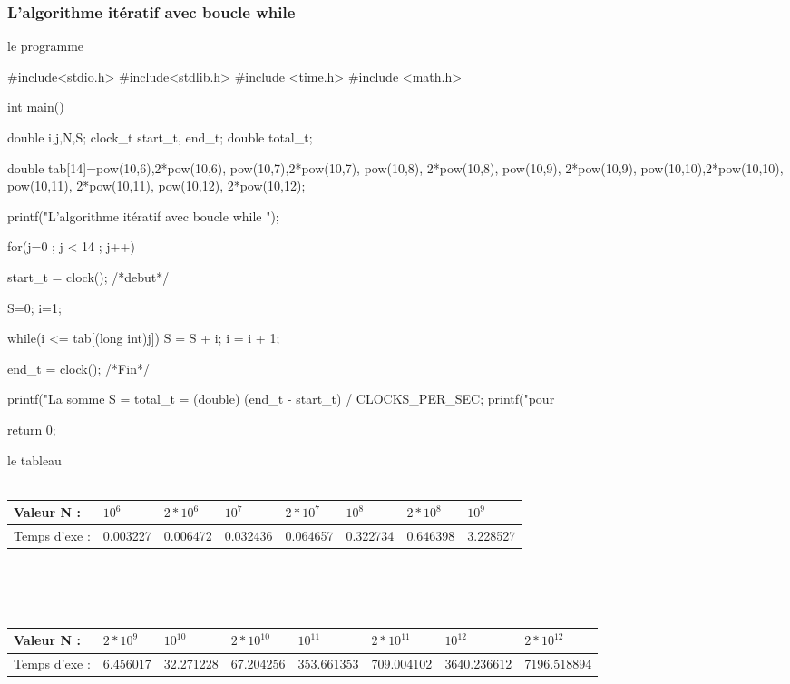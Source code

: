 \documentclass[•]{article}
\begin{document}
\subsubsection{L'algorithme itératif avec boucle while}
le programme
\begin{sql}
#include<stdio.h>
#include<stdlib.h>
#include <time.h>
#include <math.h>

 int main()
 {
 	double i,j,N,S;
	clock_t start_t, end_t;
    double total_t;
	 
	double tab[14]={pow(10,6),2*pow(10,6), pow(10,7),2*pow(10,7), pow(10,8), 2*pow(10,8),	pow(10,9), 2*pow(10,9), pow(10,10),2*pow(10,10), pow(10,11), 2*pow(10,11), pow(10,12), 2*pow(10,12)};
	
	printf("L'algorithme itératif avec boucle while \n\n");
	
	for(j=0 ; j < 14 ; j++) {
	
        start_t = clock();		/*debut*/
    
        
        S=0; i=1;
        
        while(i <= tab[(long int)j])
		{
			S = S + i;
			i = i + 1;
		}
		
        end_t = clock();		/*Fin*/
        
        printf("La somme S = %
        total_t = (double) (end_t - start_t) / CLOCKS_PER_SEC;
        printf("pour %
    }
	return 0;
 }
\end{sql}

\textrm{  }

le tableau
\\
\\
\color{blue}
\begin{tabular}{ |p{2cm}||p{1.6cm}|p{1.6cm}|p{1.6cm}|p{1.6cm}|p{1.6cm}|p{1.6cm}|p{1.6cm}| }
 \hline

 Valeur N : & $10^6$& $2*10^6$& $10^7$& $2*10^7$& $10^8$& $2*10^8$& $10^9$ \\
 \hline
 Temps d'exe :  & 0.003227 & 0.006472 & 0.032436 & 0.064657 & 0.322734 & 0.646398 &  3.228527 \\
  
 \hline
\end{tabular}
\\
\\
\\
\begin{tabular}{ |p{2cm}||p{1.6cm}|p{1.6cm}|p{1.6cm}|p{1.6cm}|p{1.6cm}|p{1.6cm}|p{1.6cm}| }
 \hline
 Valeur N : & $2*10^9$& $10^{10}$& $2*10^{10}$& $10^{11}$& $2*10^{11}$& $10^{12}$& $2*10^{12}$ \\
 \hline
 Temps d'exe : &  6.456017 & 32.271228 & 67.204256 & 353.661353 & 709.004102 & 
 3640.236612 & 7196.518894   \\
 \hline
\end{tabular}
\color{black}
\end{document}
